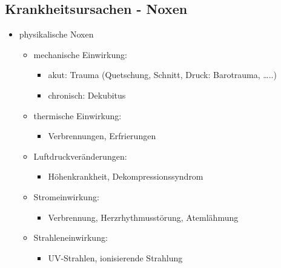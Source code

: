 \subsection{Krankheitsursachen - Noxen}
	\begin{itemize}
		\item physikalische Noxen
			\begin{itemize}
				\item mechanische Einwirkung:
					\begin{itemize}
						\item akut: Trauma (Quetschung, Schnitt, Druck: Barotrauma, …..)
						\item chronisch: Dekubitus
					\end{itemize}
				\item thermische Einwirkung:
					\begin{itemize}
						\item Verbrennungen, Erfrierungen
					\end{itemize}
				\item Luftdruckveränderungen:
					\begin{itemize}
						\item Höhenkrankheit, Dekompressionssyndrom
					\end{itemize}
				\item Stromeinwirkung:
					\begin{itemize}
						\item Verbrennung, Herzrhythmusstörung, Atemlähmung
					\end{itemize}
				\item Strahleneinwirkung:
					\begin{itemize}
						\item UV-Strahlen, ionisierende Strahlung
					\end{itemize}
			\end{itemize}
	\end{itemize}

